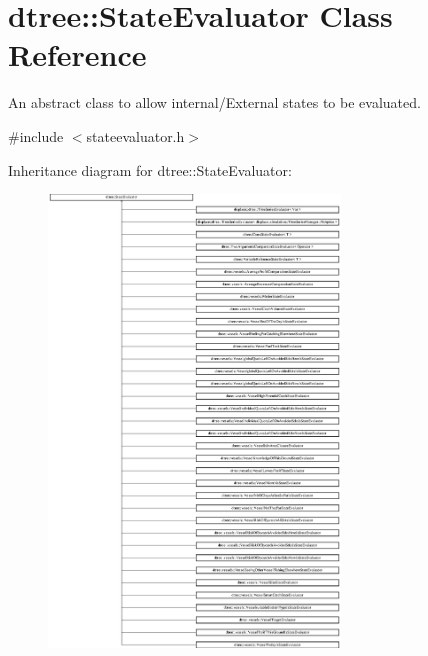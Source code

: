 \hypertarget{classdtree_1_1_state_evaluator}{}\section{dtree\+::State\+Evaluator Class Reference}
\label{classdtree_1_1_state_evaluator}


An abstract class to allow internal/\+External states to be evaluated.  




{\ttfamily \#include $<$stateevaluator.\+h$>$}

Inheritance diagram for dtree\+::State\+Evaluator\+:\begin{figure}[H]
\begin{center}
\leavevmode
\includegraphics[height=12.000000cm]{d3/d7a/classdtree_1_1_state_evaluator}
\end{center}
\end{figure}
